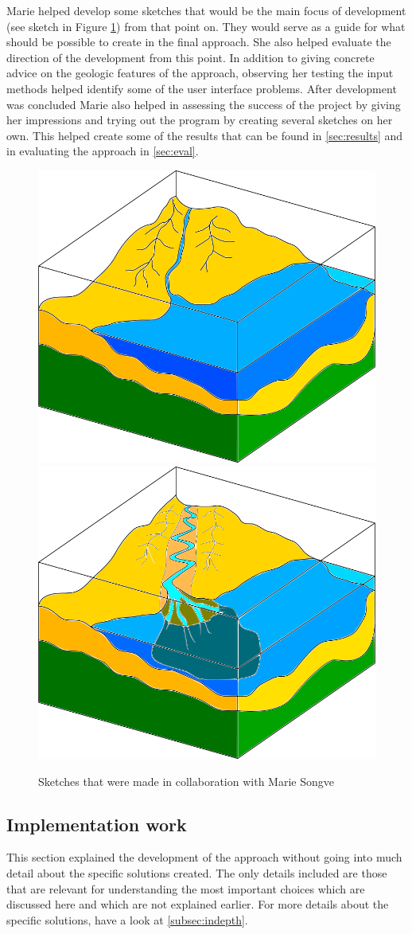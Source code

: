 \documentclass[a4paper,12pt]{report}
\newcommand{\secref}[1]{\autoref{#1}}
\begin{document}

Marie helped develop some sketches that would be the main focus of development (see sketch in Figure \ref{fig:illuSketch}) from that point on. They would serve as a guide for what should be possible to create in the final approach. She also helped evaluate the direction of the development from this point. In addition to giving concrete advice on the geologic features of the approach, observing her testing the input methods helped identify some of the user interface problems. After development was concluded Marie also helped in assessing the success of the project by giving her impressions and trying out the program by creating several sketches on her own. This helped create some of the results that can be found in \secref{sec:results} and in evaluating the approach in \secref{sec:eval}. 

\begin{figure}
 \centering
\includegraphics[width=.4\linewidth]{thesis/illuSketch1.png}
\includegraphics[width=.4\linewidth]{thesis/illuSketch2.png}
 \caption{Sketches that were made in collaboration with Marie Songve}
 \label{fig:illuSketch}
\end{figure}

\subsection{Implementation work}

This section explained the development of the approach without going into much detail about the specific solutions created. The only details included are those that are relevant for understanding the most important choices which are discussed here and which are not explained earlier. For more details about the specific solutions, have a look at \secref{subsec:indepth}.
\end{document}
